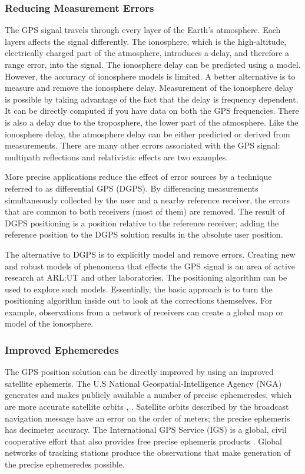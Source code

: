 \subsubsection{Reducing Measurement Errors}

The GPS signal travels through every layer of the Earth's atmosphere. Each layers affects the signal differently. The ionosphere, which is the high-altitude, electrically charged part of the atmosphere, introduces a delay, and therefore a range error, into the signal. The ionosphere delay can be predicted using a model. However, the accuracy of ionosphere models is limited. A better alternative is to measure and remove the ionosphere delay. Measurement of the ionosphere delay is possible by taking advantage of the fact that the delay is frequency dependent. It can be directly computed if you have data on both the GPS frequencies. There is also a delay due to the troposphere, the lower part of the atmosphere. Like the ionosphere delay, the atmosphere delay can be either predicted or derived from measurements. There are many other errors associated with the GPS signal: multipath reflections and relativistic effects are two examples.

More precise applications reduce the effect of error sources by a technique referred to as differential GPS (DGPS). By differencing measurements simultaneously collected by the user and a nearby reference receiver, the errors that are common to both receivers (most of them) are removed. The result of DGPS positioning is a position relative to the reference receiver; adding the reference position to the DGPS solution results in the absolute user position.

The alternative to DGPS is to explicitly model and remove errors. Creating new and robust models of phenomena that effects the GPS signal is an area of active research at ARL:UT and other laboratories. The positioning algorithm can be used to explore such models. Essentially, the basic approach is to turn the positioning algorithm inside out to look at the corrections themselves. For example, observations from a network of receivers can create a global map or model of the ionosphere.


\subsubsection{Improved Ephemeredes}

The GPS position solution can be directly improved by using an improved satellite ephemeris. The U.S National Geospatial-Intelligence Agency (NGA) generates and makes publicly available a number of precise ephemeredes, which are more accurate satellite orbits \cite{nga:iongnss06}, \cite{nga:website}. Satellite orbits described by the broadcast navigation message have an error on the order of meters; the precise ephemeris has decimeter accuracy. The International GPS Service (IGS) is a global, civil cooperative effort that also provides free precise ephemeris products \cite{igs:reference}. Global networks of tracking stations produce the observations that make generation of the precise ephemeredes possible.


